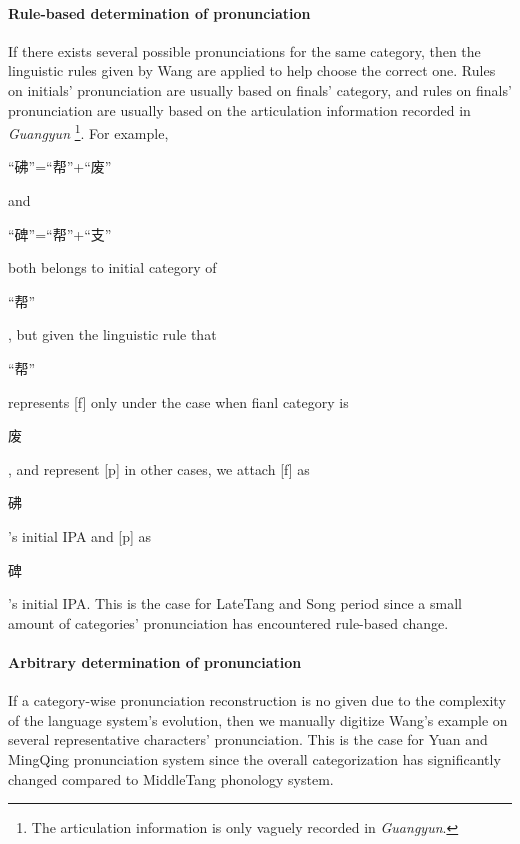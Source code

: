     \paragraph{Rule-based determination of pronunciation}
    If there exists several possible pronunciations for the same category,
    then the linguistic rules given by Wang are applied to help choose the correct one. Rules on initials' pronunciation are usually based on finals' category, and rules on finals' pronunciation are usually based on the articulation information recorded in \textit{Guangyun}
    \footnote{The articulation information is only vaguely recorded in \textit{Guangyun}.}. For example, \begin{CJK*}{UTF8}{gbsn}“砩”=“帮”+“废”\end{CJK*} and \begin{CJK*}{UTF8}{gbsn}“碑”=“帮”+“支”\end{CJK*} both belongs to initial category of \begin{CJK*}{UTF8}{gbsn}“帮”\end{CJK*}, but given the linguistic rule that \begin{CJK*}{UTF8}{gbsn}“帮”\end{CJK*} represents [f] only under the case when fianl category is \begin{CJK*}{UTF8}{gbsn}废\end{CJK*}, and represent [p] in other cases, we attach [f] as \begin{CJK*}{UTF8}{gbsn}砩\end{CJK*}'s initial IPA and [p] as \begin{CJK*}{UTF8}{gbsn}碑\end{CJK*}'s initial IPA.
    This is the case for LateTang and Song period since a small amount of categories' pronunciation has encountered rule-based change.
    
    \paragraph{Arbitrary determination of pronunciation}
    
    If a category-wise pronunciation reconstruction is no given due to the complexity of the language system's evolution, then we manually digitize Wang's example on several representative characters' pronunciation. This is the case for Yuan and MingQing
    pronunciation system since the overall categorization has significantly changed compared to MiddleTang phonology system.
    
